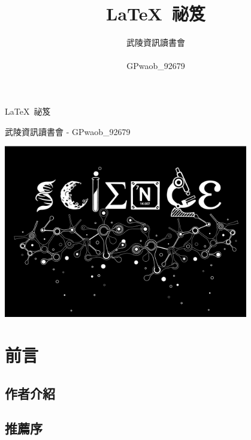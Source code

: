 \documentclass[14pt, a4paper, oneside]{extbook}
\title{
	\sffamily\Huge \LaTeX\ 祕笈
}
\author{
	\sffamily\LARGE 武陵資訊讀書會 \\\\
	\fontspec{Torus}{}\LARGE GPwaob\_92679
}
\date{}
\let\tmpLaTeX\LaTeX
\renewcommand{\LaTeX}{\textrm{\tmpLaTeX}}
\begin{document}
	\begin{titlepage}
		\begin{center}
			\sffamily
			
			\begin{tcolorbox}[
				halign=flush center,
				drop fuzzy shadow,
				arc=2pt,
				height=4cm,
				valign=center]
				\Huge \LaTeX\ 祕笈
			\end{tcolorbox}
			
			\vspace*{1cm}
		
			{\fontsize{24pt}{\baselineskip}\selectfont 武陵資訊讀書會 - GPwaob\_92679}
			
			\vfill
			
			\includegraphics[width=0.8\textwidth]{readme/science.png}
		
		
		\end{center}
	\end{titlepage}

	\tableofcontents

	\part{前言}
	\chapter*{作者介紹}
		
	\chapter*{推薦序}
			
\end{document}
